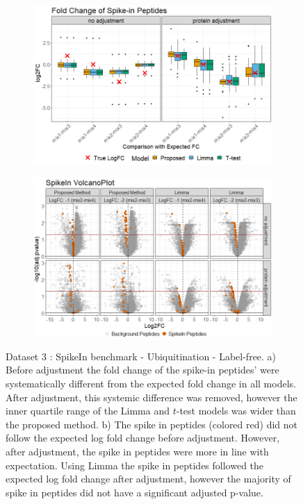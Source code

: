 \documentclass[mcp]{article}
\numberwithin{table}{section}
\begin{document}
\begin{figure}[ht]
\centering
\begin{subfigure}[c]{0.825\linewidth}
\includegraphics[width=1\textwidth]{images/spike_in_fc.png}
\caption{}
\label{fig:spikein_boxplot}
\end{subfigure}
\begin{subfigure}[c]{0.825\linewidth}
\includegraphics[width=1\textwidth]{images/spike_in_volcano.png}
\caption{}
\label{fig:spikein_prop_volcano}
\end{subfigure}
\caption{Dataset 3 : SpikeIn benchmark - Ubiquitination - Label-free. a) Before adjustment the fold change of the spike-in peptides' were systematically different from the expected fold change in all models. After adjustment, this systemic difference was removed, however the inner quartile range of the Limma and $t$-test models was wider than the proposed method. b) The spike in peptides (colored red) did not follow the expected log fold change before adjustment. However, after adjustment, the spike in peptides were more in line with expectation. Using Limma the spike in peptides followed the expected log fold change after adjustment, however the majority of spike in peptides did not have a significant adjusted p-value.}
\label{fig:spikein_volcano}
\end{figure}
\end{document}
